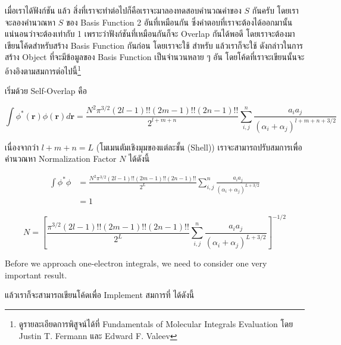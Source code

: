 \vspace{5pt}

เมื่อเราได้ฟังก์ชัน  แล้ว สิ่งที่เราจะทำต่อไปก็คือเราจะมาลองทดสอบคำนวณค่าของ $S$ กันครับ โดยเราจะลองคำนวณหา $S$
ของ Basis Function 2 อันที่เหมือนกัน ซึ่งคำตอบที่เราจะต้องได้ออกมานั้นแน่นอนว่าจะต้องเท่ากับ 1 เพราะว่าฟังก์ชันที่เหมือนกันก็จะ Overlap
กันได้พอดี โดยเราจะต้องมาเขียนโค้ดสำหรับสร้าง Basis Function กันก่อน โดยเราจะใช้  สำหรับ 
แล้วเราก็จะใช้  ดังกล่าวในการสร้าง Object ที่จะมีข้อมูลของ  Basis Function เป็นจำนวนหลาย ๆ อัน
โดยโค้ดที่เราจะเขียนนั้นจะอ้างอิงตามสมการต่อไปนี้\footnote{ดูรายละเอียดการพิสูจน์ได้ที่ Fundamentals of Molecular Integrals Evaluation
  โดย Justin T. Fermann และ Edward F. Valeev\autocite{fermann2020}}

เริ่มด้วย Self-Overlap คือ

\begin{equation}
  \int \phi^*(\mathbf{r}) \phi(\mathbf{r}) d \mathbf{r}
  =
  \frac{N^2 \pi^{3 / 2}(2 l-1) ! !(2 m-1) ! !(2 n-1) ! !}{2^{l+m+n}}
  \sum_{i, j}^n \frac{a_i a_j}{\left(\alpha_i+\alpha_j\right)^{l+m+n+3 / 2}}
\end{equation}

\noindent เนื่องจากว่า $l + m + n = L$ (โมเมนตัมเชิงมุมของแต่ละชั้น (Shell)) เราจะสามารถปรับสมการเพื่อคำนวณหา Normalization
Factor $N$ ได้ดังนี้

\begin{align}
  \int \phi^* \phi
   & =
  \frac{N^2 \pi^{3 / 2}(2 l-1) ! !(2 m-1) ! !(2 n-1) ! !}{2^L}
  \sum_{i, j}^n \frac{a_i a_j}{\left(\alpha_i+\alpha_j\right)^{L+3 / 2}} \\
   & =
  1
\end{align}

\begin{equation}
  N
  =
  \left[
    \frac{\pi^{3 / 2}(2 l-1) ! !(2 m-1) ! !(2 n-1) ! !}{2^L}
    \sum_{i, j}^n \frac{a_i a_j}{\left(\alpha_i+\alpha_j\right)^{L+3 / 2}}
    \right]^{-1 / 2}
\end{equation}

Before we approach one-electron integrals, we need to consider one very important result.

\noindent แล้วเราก็จะสามารถเขียนโค้ดเพื่อ Implement สมการที่ ได้ดังนี้

\vspace{5pt}

